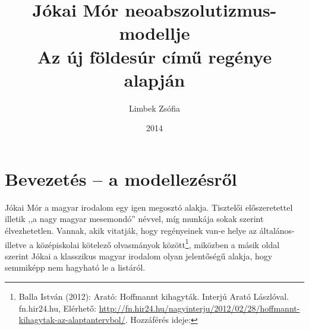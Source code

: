 \documentclass{thesis-ekf}
\begin{document}
    \title{Jókai Mór neoabszolutizmus-modellje\\Az új földesúr című regénye alapján}
    \author{Limbek Zsófia}
    \date{2014}

    \maketitle
    \tableofcontents


    \chapter{Bevezetés – a modellezésről}\label{ch:bevezetes--a-modellezesrol}

    Jókai Mór a magyar irodalom egy igen megosztó alakja.
    Tisztelői előszeretettel illetik ,,a nagy magyar mesemondó'' névvel, míg munkája sokak szerint élvezhetetlen.
    Vannak, akik vitatják, hogy regényeinek van-e helye az általános- illetve a középiskolai kötelező olvasmányok
        között\footnote{Balla István (2012): Arató: Hoffmannt kihagyták. Interjú Arató Lászlóval.
            fn.hir24.hu, 
            Elérhető: \url{http://fn.hir24.hu/nagyinterju/2012/02/28/hoffmannt-kihagytak-az-alaptantervbol/}.
            Hozzáférés ideje: },
        miközben a másik oldal szerint Jókai a klasszikus magyar irodalom olyan jelentőségű alakja, hogy semmiképp
        nem hagyható le a listáról.
\end{document}
